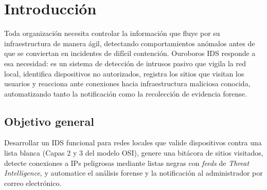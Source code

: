 \documentclass[12pt,letterpaper]{report}
\begin{document}
\begin{abstract}
\noindent
Ouroboros es un Sistema de Detección de Intrusos (IDS) de red desarrollado en
Python para redes locales institucionales sobre GNU/Linux. Captura tráfico en
tiempo real mediante Scapy, mantiene una lista blanca dinámica de dispositivos
por dirección MAC (Capa 2) e IP (Capa 3), registra las consultas DNS de los
usuarios, detecta conexiones hacia IPs asociadas a malware mediante una lista
negra alimentada por \textit{feeds} de \textit{Threat Intelligence}, y ante
cada incidente notifica al administrador por correo electrónico con un
reporte forense automatizado que incluye resolución DNS inversa (rDNS),
categorías de ataque decodificadas (taxonomía de 23 categorías de AbuseIPDB),
score de abuso, historial de reportes, geolocalización y WHOIS. El sistema
se administra mediante un \textit{dashboard} web con autenticación JWT,
control de acceso por roles y una CLI. Este documento integra el manual de
usuario, la documentación de arquitectura, las medidas de protección de
credenciales y el análisis jurídico del monitoreo conforme a la legislación
mexicana vigente.\\[0.3cm]
\textbf{Palabras clave:} IDS, Scapy, lista blanca, \textit{threat
intelligence}, análisis forense, JWT, LFPDPPP.
\end{abstract}

\chapter{Introducción}

Toda organización necesita controlar la información que fluye por su
infraestructura de manera ágil, detectando comportamientos anómalos antes de
que se conviertan en incidentes de difícil contención. Ouroboros IDS responde
a esa necesidad: es un sistema de detección de intrusos pasivo que vigila la
red local, identifica dispositivos no autorizados, registra los sitios que
visitan los usuarios y reacciona ante conexiones hacia infraestructura
maliciosa conocida, automatizando tanto la notificación como la recolección
de evidencia forense.

\section{Objetivo general}
Desarrollar un IDS funcional para redes locales que valide dispositivos
contra una lista blanca (Capas 2 y 3 del modelo OSI), genere una bitácora de
sitios visitados, detecte conexiones a IPs peligrosas mediante listas negras
con \textit{feeds} de \textit{Threat Intelligence}, y automatice el análisis
forense y la notificación al administrador por correo electrónico.
\end{document}
